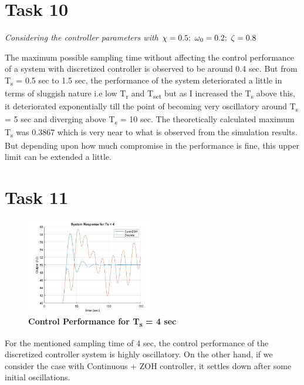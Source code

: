 \documentclass[a4paper,12pt,oneside,onecolumn]{article} %
\begin{document}
\section*{Task 10}

\begin{center}
\textit{Considering the controller parameters with $\chi = 0.5; \ \omega \textsubscript{0} = 0.2; \ \zeta =0.8$ } \\
\end{center}
The maximum possible sampling time without affecting the control performance of a system with discretized controller is observed to be around 0.4 sec. But from  T\textsubscript{s} = 0.5 sec to 1.5 sec, the performance of the system deteriorated a little in terms of sluggish nature i.e low T\textsubscript{r} and T\textsubscript{set} but as I increased the T\textsubscript{s} above this, it deteriorated exponentially till the point of becoming very oscillatory around T\textsubscript{s} = 5 sec and diverging above T\textsubscript{s} = 10 sec.
The theoretically calculated maximum T\textsubscript{s} was 0.3867 which is very near to what is observed from the simulation results. But depending upon how much compromise in the performance is fine, this upper limit can be extended a little.

\section*{Task 11}

\begin{figure}[H]
\centering
  \includegraphics[width = 0.5\textwidth]{ex_11_new}
\caption{\textbf{Control Performance for T\textsubscript{s} = 4 sec}}
 \end{figure}

For the mentioned sampling time of 4 sec, the control performance of the discretized controller system is highly oscillatory. On the other hand, if we consider the case with Continuous + ZOH controller, it settles down after some initial oscillations.
\end{document}
